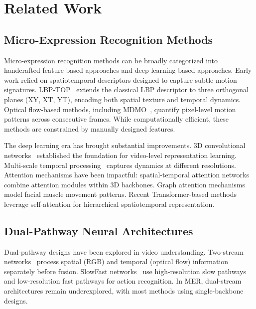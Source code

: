 
\section{Related Work}
\label{sec:related}

\subsection{Micro-Expression Recognition Methods}

Micro-expression recognition methods can be broadly categorized into handcrafted feature-based approaches and deep learning-based approaches. Early work relied on spatiotemporal descriptors designed to capture subtle motion signatures. LBP-TOP~\cite{zhao2007lbptop} extends the classical LBP descriptor to three orthogonal planes (XY, XT, YT), encoding both spatial texture and temporal dynamics. Optical flow-based methods, including MDMO~\cite{wang2015offapexnet}, quantify pixel-level motion patterns across consecutive frames. While computationally efficient, these methods are constrained by manually designed features.

The deep learning era has brought substantial improvements. 3D convolutional networks~\cite{tran2015c3d} established the foundation for video-level representation learning. Multi-scale temporal processing~\cite{ben2022survey} captures dynamics at different resolutions. Attention mechanisms have been impactful: spatial-temporal attention networks combine attention modules within 3D backbones. Graph attention mechanisms~\cite{ben2022survey} model facial muscle movement patterns. Recent Transformer-based methods~\cite{liu2022videoSwin} leverage self-attention for hierarchical spatiotemporal representation.

\subsection{Dual-Pathway Neural Architectures}

Dual-pathway designs have been explored in video understanding. Two-stream networks~\cite{simonyan2014twostream} process spatial (RGB) and temporal (optical flow) information separately before fusion. SlowFast networks~\cite{feichtenhofer2019slowfast} use high-resolution slow pathways and low-resolution fast pathways for action recognition. In MER, dual-stream architectures remain underexplored, with most methods using single-backbone designs.

